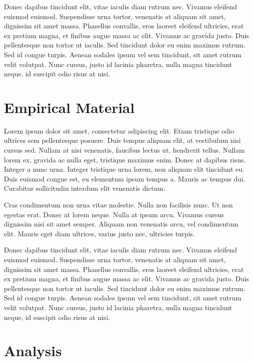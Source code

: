 \documentclass[11pt, a4paper]{JTH}
\begin{document}
Donec dapibus tincidunt elit, vitae iaculis diam rutrum nec. Vivamus eleifend euismod euismod. Suspendisse urna tortor, venenatis at aliquam sit amet, dignissim sit amet massa. Phasellus convallis, eros laoreet eleifend ultricies, erat ex pretium magna, et finibus augue massa ac elit. Vivamus ac gravida justo. Duis pellentesque non tortor ut iaculis. Sed tincidunt dolor eu enim maximus rutrum. Sed id congue turpis. Aenean sodales ipsum vel sem tincidunt, sit amet rutrum velit volutpat. Nunc cursus, justo id lacinia pharetra, nulla magna tincidunt neque, id suscipit odio risus at nisi.

\chapter{Empirical Material}
\label{chap:EmpiricalMaterial}

Lorem ipsum dolor sit amet, consectetur adipiscing elit. Etiam tristique odio ultrices sem pellentesque posuere. Duis tempus aliquam elit, at vestibulum nisi cursus sed. Nullam at nisi venenatis, faucibus lectus ut, hendrerit tellus. Nullam lorem ex, gravida ac nulla eget, tristique maximus enim. Donec at dapibus risus. Integer a nunc urna. Integer tristique urna lorem, non aliquam elit tincidunt eu. Duis euismod congue est, eu elementum ipsum tempus a. Mauris ac tempus dui. Curabitur sollicitudin interdum elit venenatis dictum.

Cras condimentum non urna vitae molestie. Nulla non facilisis nunc. Ut non egestas erat. Donec at lorem neque. Nulla at ipsum arcu. Vivamus cursus dignissim nisi sit amet semper. Aliquam non venenatis arcu, vel condimentum elit. Mauris eget diam ultrices, varius justo nec, ultricies turpis.

Donec dapibus tincidunt elit, vitae iaculis diam rutrum nec. Vivamus eleifend euismod euismod. Suspendisse urna tortor, venenatis at aliquam sit amet, dignissim sit amet massa. Phasellus convallis, eros laoreet eleifend ultricies, erat ex pretium magna, et finibus augue massa ac elit. Vivamus ac gravida justo. Duis pellentesque non tortor ut iaculis. Sed tincidunt dolor eu enim maximus rutrum. Sed id congue turpis. Aenean sodales ipsum vel sem tincidunt, sit amet rutrum velit volutpat. Nunc cursus, justo id lacinia pharetra, nulla magna tincidunt neque, id suscipit odio risus at nisi.

\chapter{Analysis}
\label{chap:Analysis}
\end{document}
